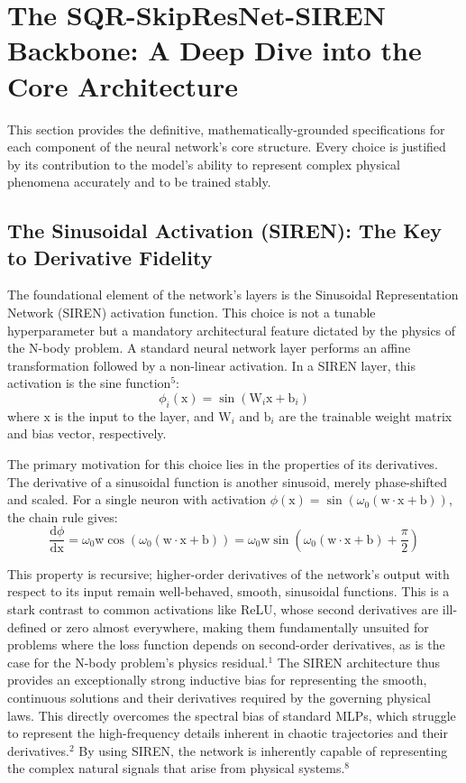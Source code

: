 \section{The SQR-SkipResNet-SIREN Backbone: A Deep Dive into the Core Architecture}

This section provides the definitive, mathematically-grounded specifications for each component of the neural network's core structure. Every choice is justified by its contribution to the model's ability to represent complex physical phenomena accurately and to be trained stably.

\subsection{The Sinusoidal Activation (SIREN): The Key to Derivative Fidelity}

The foundational element of the network's layers is the Sinusoidal Representation Network (SIREN) activation function. This choice is not a tunable hyperparameter but a mandatory architectural feature dictated by the physics of the $\mathrm{N}$-body problem. A standard neural network layer performs an affine transformation followed by a non-linear activation. In a SIREN layer, this activation is the sine function$^5$:
\[
\phi_i(\mathrm{x}) = \sin(\mathrm{W}_i \mathrm{x} + \mathrm{b}_i)
\]
where $\mathrm{x}$ is the input to the layer, and $\mathrm{W}_i$ and $\mathrm{b}_i$ are the trainable weight matrix and bias vector, respectively.

The primary motivation for this choice lies in the properties of its derivatives. The derivative of a sinusoidal function is another sinusoid, merely phase-shifted and scaled. For a single neuron with activation $\phi(\mathrm{x}) = \sin(\omega_0 (\mathrm{w} \cdot \mathrm{x} + \mathrm{b}))$, the chain rule gives:
\[
\frac{\mathrm{d} \phi}{\mathrm{d} \mathrm{x}} = \omega_0 \mathrm{w} \cos(\omega_0 (\mathrm{w} \cdot \mathrm{x} + \mathrm{b})) = \omega_0 \mathrm{w} \sin(\omega_0 (\mathrm{w} \cdot \mathrm{x} + \mathrm{b}) + \frac{\pi}{2})
\]

This property is recursive; higher-order derivatives of the network's output with respect to its input remain well-behaved, smooth, sinusoidal functions. This is a stark contrast to common activations like ReLU, whose second derivatives are ill-defined or zero almost everywhere, making them fundamentally unsuited for problems where the loss function depends on second-order derivatives, as is the case for the $\mathrm{N}$-body problem's physics residual.$^1$ The SIREN architecture thus provides an exceptionally strong inductive bias for representing the smooth, continuous solutions and their derivatives required by the governing physical laws. This directly overcomes the spectral bias of standard MLPs, which struggle to represent the high-frequency details inherent in chaotic trajectories and their derivatives.$^2$ By using SIREN, the network is inherently capable of representing the complex natural signals that arise from physical systems.$^8$


